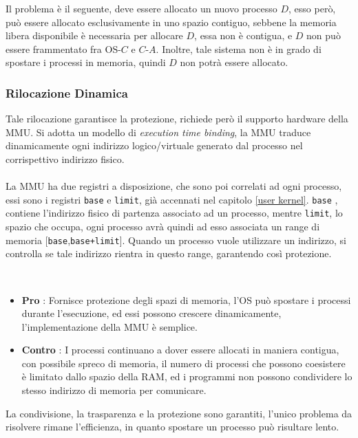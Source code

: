 \documentclass[12pt, letterpaper]{article}
\newcommand{\code}[1]{\colorbox{light-gray}{\texttt{#1}}}
\newcommand{\acc}{\\\hphantom{}\\}
\begin{document}
Il problema è il seguente, deve essere allocato un nuovo processo \(D\), esso però, può essere allocato esclusivamente 
in uno spazio contiguo, sebbene la memoria libera disponibile è necessaria per allocare \(D\), essa non è 
contigua, e \(D\) non può essere frammentato fra OS-\(C\) e \(C\)-\(A\). Inoltre, tale sistema non è in grado di spostare 
i processi in memoria, quindi \(D\) non potrà essere allocato.
\subsubsection{Rilocazione Dinamica}
Tale rilocazione garantisce la protezione, richiede però il supporto hardware della MMU. 
Si adotta un modello di  \textit{execution time binding}, la MMU traduce dinamicamente ogni indirizzo 
logico/virtuale generato dal processo nel corrispettivo indirizzo fisico. \acc 
La MMU ha due registri a disposizione, che sono poi correlati ad ogni processo, essi sono i registri 
\code{base} e \code{limit}, già accennati nel capitolo \ref{user kernel}. \code{base} , contiene l'indirizzo fisico 
di partenza associato ad un processo, mentre \code{limit}, lo spazio che occupa, ogni processo avrà quindi 
ad esso associata un range di memoria [\code{base},\code{base+limit}]. Quando un processo vuole utilizzare 
un indirizzo, si controlla se tale indirizzo rientra in questo range, garantendo così protezione.
\begin{figure}[h]
\end{figure}\\
\begin{itemize}
    \item \textbf{Pro} : Fornisce protezione degli spazi di memoria, l'OS può spostare i processi durante l'esecuzione, ed 
    essi possono crescere dinamicamente, l'implementazione della MMU è semplice.
    \item \textbf{Contro} : I processi continuano a dover essere allocati in maniera contigua, con possibile spreco 
    di memoria, il numero di processi che possono coesistere è limitato dallo spazio della RAM, ed i programmi 
    non possono condividere lo stesso indirizzo di memoria per comunicare.
\end{itemize}
La condivisione, la trasparenza e la protezione sono garantiti, l'unico problema da risolvere rimane l'efficienza, in quanto 
spostare un processo può risultare lento.\acc 
\end{document}
